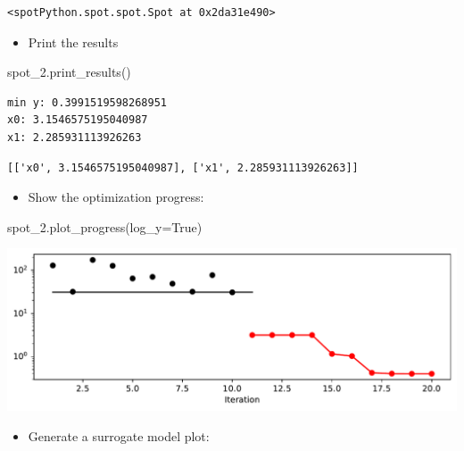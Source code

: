 \documentclass[
  letterpaper,
  DIV=11,
  numbers=noendperiod]{scrreprt}
\newenvironment{Shaded}{\begin{snugshade}}{\end{snugshade}}
\newcommand{\NormalTok}[1]{\textcolor[rgb]{0.00,0.23,0.31}{#1}}
\newcommand{\OperatorTok}[1]{\textcolor[rgb]{0.37,0.37,0.37}{#1}}
\newcommand{\VariableTok}[1]{\textcolor[rgb]{0.07,0.07,0.07}{#1}}
\providecommand{\tightlist}{%
  \setlength{\itemsep}{0pt}\setlength{\parskip}{0pt}}\usepackage{longtable,booktabs,array}
\begin{document}
\begin{verbatim}
<spotPython.spot.spot.Spot at 0x2da31e490>
\end{verbatim}

\begin{itemize}
\tightlist
\item
  Print the results
\end{itemize}

\begin{Shaded}
\begin{Highlighting}[]
\NormalTok{spot\_2.print\_results()}
\end{Highlighting}
\end{Shaded}

\begin{verbatim}
min y: 0.3991519598268951
x0: 3.1546575195040987
x1: 2.285931113926263
\end{verbatim}

\begin{verbatim}
[['x0', 3.1546575195040987], ['x1', 2.285931113926263]]
\end{verbatim}

\begin{itemize}
\tightlist
\item
  Show the optimization progress:
\end{itemize}

\begin{Shaded}
\begin{Highlighting}[]
\NormalTok{spot\_2.plot\_progress(log\_y}\OperatorTok{=}\VariableTok{True}\NormalTok{)}
\end{Highlighting}
\end{Shaded}

\includegraphics{010_num_spot_sklearn_surrogate_files/figure-pdf/cell-32-output-1.pdf}

\begin{itemize}
\tightlist
\item
  Generate a surrogate model plot:
\end{itemize}
\end{document}
